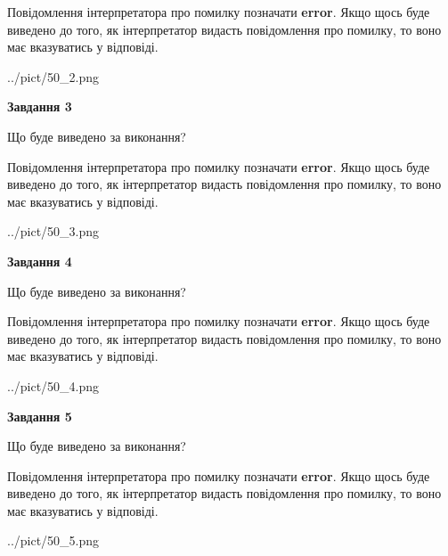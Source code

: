 \documentclass[12pt, ukrainian]{article}
\begin{document}
{\begin {large}
Повідомлення інтерпретатора про помилку позначати \textbf{error}.
Якщо щось буде виведено до того, як інтерпретатор видасть повідомлення про помилку, 
то воно має вказуватись у відповіді. \par


\begin{center}
	{../pict/50_2.png}
\end{center}
\newpage

{\begin {center}\textbf{Завдання 3}\end {center}}\par
Що буде виведено за виконання?

Повідомлення інтерпретатора про помилку позначати \textbf{error}.
Якщо щось буде виведено до того, як інтерпретатор видасть повідомлення про помилку, 
то воно має вказуватись у відповіді. \par


\begin{center}
	{../pict/50_3.png}
\end{center}
\newpage

{\begin {center}\textbf{Завдання 4}\end {center}}\par
Що буде виведено за виконання?

Повідомлення інтерпретатора про помилку позначати \textbf{error}.
Якщо щось буде виведено до того, як інтерпретатор видасть повідомлення про помилку, 
то воно має вказуватись у відповіді. \par


\begin{center}
	{../pict/50_4.png}
\end{center}
\newpage

{\begin {center}\textbf{Завдання 5}\end {center}}\par
Що буде виведено за виконання?

Повідомлення інтерпретатора про помилку позначати \textbf{error}.
Якщо щось буде виведено до того, як інтерпретатор видасть повідомлення про помилку, 
то воно має вказуватись у відповіді. \par


\begin{center}
	{../pict/50_5.png}
\end{center}
\newpage


\end{large}}
\end{document}
